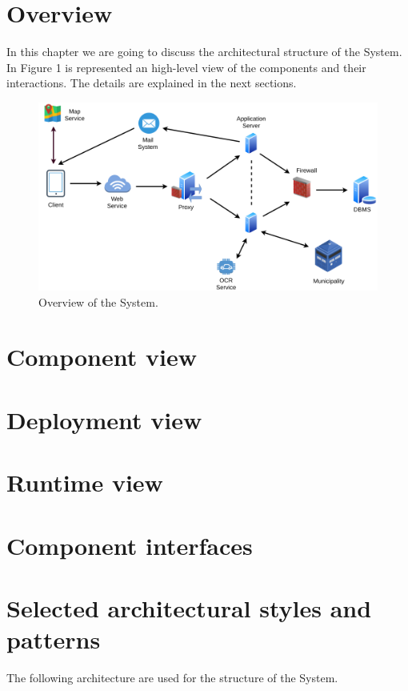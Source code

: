 \documentclass{report}
\begin{document}
\section{Overview}
In this chapter we are going to discuss the architectural structure of the System. In Figure 1 is represented an high-level view of the components and their interactions. The details are explained in the next sections.
\begin{figure}[!ht]
	\begin{center}
	\includegraphics[width=\textwidth]{img/HighLevelOverview.png}
	\end{center}
	\caption{Overview of the System.}
\end{figure}

\section{Component view}

\section{Deployment view}

\section{Runtime view}

\section{Component interfaces}

\section{Selected architectural	styles and patterns}
The following architecture are used for the structure of the System.
\end{document}
